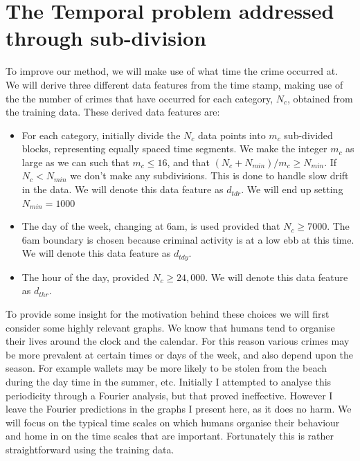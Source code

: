 \documentclass[12pt,notitlepage]{article}
\begin{document}
\section{The Temporal problem addressed through sub-division}

To improve our method, we will make use of what time the crime occurred at. We will derive three different data features from the time stamp, making use of the the number of crimes that have occurred for each category, $N_c$, obtained from the training data. These derived data features are:  
\begin{itemize}
\item For each category, initially divide the $N_c$ data points into $m_c$ sub-divided blocks, representing equally spaced time segments. We make the integer $m_c$ as large as we can such that $m_c\leqslant16$, and that $(N_c + N_{min})/m_c \geqslant N_{min}$. If $N_c<N_{min}$ we don't make any subdivisions. This is done to handle slow drift in the data. We will denote this data feature as $d_{tdr}.$ We will end up setting  $N_{min}=1000$
\item The day of the week, changing at 6am, is used provided that $N_c\geqslant7000$. The 6am boundary is chosen because
criminal activity is at a low ebb at this time. We will denote this data feature as $d_{tdy}.$
\item The hour of the day, provided $N_c\geqslant24,000$. We will denote this data feature as $d_{thr}.$
\label{list-1}
\end{itemize}

To provide some insight for the motivation behind these choices we will first consider some highly relevant graphs. We know that humans tend to organise their lives around the clock and the calendar. For this reason various crimes may be more prevalent at certain times or days of the week, and also depend upon the season. For example wallets may be more likely to be stolen from the beach during the day time in the summer, etc. Initially I attempted to analyse this periodicity through a Fourier analysis, but that proved ineffective. However I leave the Fourier predictions in the graphs I present here, as it does no harm. We will focus on the typical time scales on which humans organise their behaviour and home in on the time scales that are important. Fortunately this is rather straightforward using the training data. 
\end{document}
